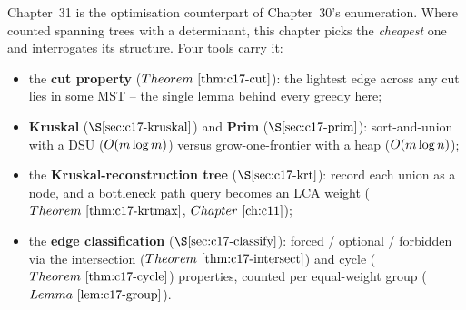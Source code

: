 

Chapter~31 is the optimisation counterpart of Chapter~30's enumeration.  Where
 counted spanning trees with a determinant, this chapter picks the
\emph{cheapest} one and interrogates its structure.  Four tools carry it:

\begin{itemize}[nosep]
  \item the \textbf{cut property} (\(\thmref{c17-cut}\)): the lightest edge across
        any cut lies in some MST -- the single lemma behind every greedy here;
  \item \textbf{Kruskal} (\(\secref{c17-kruskal}\)) and \textbf{Prim}
        (\(\secref{c17-prim}\)): sort-and-union with a DSU (\(O(m\log m)\))
        versus grow-one-frontier with a heap (\(O(m\log n)\));
  \item the \textbf{Kruskal-reconstruction tree} (\(\secref{c17-krt}\)): record
        each union as a node, and a bottleneck path query becomes an LCA weight
        (\(\thmref{c17-krtmax}\), \(\chref{c11}\));
  \item the \textbf{edge classification} (\(\secref{c17-classify}\)): forced /
        optional / forbidden via the intersection (\(\thmref{c17-intersect}\))
        and cycle (\(\thmref{c17-cycle}\)) properties, counted per equal-weight
        group (\(\lemref{c17-group}\)).
\end{itemize}

